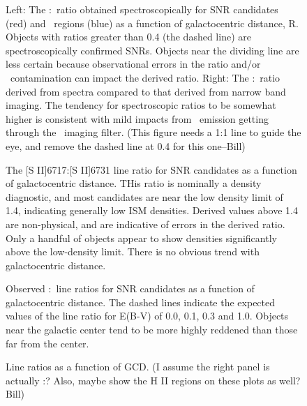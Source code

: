 \begin{figure}
\caption{Left: The \sii:\ha\ ratio obtained spectroscopically for SNR candidates (red) and \hii\ regions (blue) as a function of galactocentric distance, R.  Objects with ratios greater than 0.4 (the dashed line) are spectroscopically confirmed SNRs.  Objects near the dividing line are less certain because observational errors in the ratio and/or \hii\ contamination can impact the derived ratio. Right: The \sii:\ha\ ratio derived from spectra compared to that derived from narrow band imaging.  The tendency for spectroscopic ratios to be somewhat higher is consistent with mild impacts from \nii\ emission getting through the \ha\ imaging filter. (This figure needs a 1:1 line to guide the eye, and remove the dashed line at 0.4 for this one--Bill) \label{fig_s2_ha}}

\end{figure}

\begin{figure}
\caption{The [S II]6717:[S II]6731 line ratio for SNR candidates as a function of galactocentric distance.  THis ratio is nominally a density diagnostic, and most candidates are near the low density limit of 1.4, indicating generally low ISM densities. Derived values above 1.4 are non-physical, and are indicative of errors in the derived ratio.  Only a handful of objects appear to show densities significantly above the low-density limit.  There is no obvious trend with galactocentric distance.  \label{fig_s2_ratio}}
\end{figure}

\begin{figure}
\caption{Observed \hb:\ha\ line ratios for SNR candidates as a function of galactocentric distance. The dashed lines indicate the expected values of the line ratio for E(B-V) of 0.0, 0.1, 0.3 and 1.0.  Objects near the galactic center tend to be more highly reddened than those far from the center. \label{fig_reddening}}
\end{figure}

\begin{figure}
\caption{Line ratios as a function of GCD.  (I assume the right panel is actually \sii:\ha?  Also, maybe show the H II regions on these plots as well?  Bill) \label{fig_metal_ratios}}

\end{figure}


